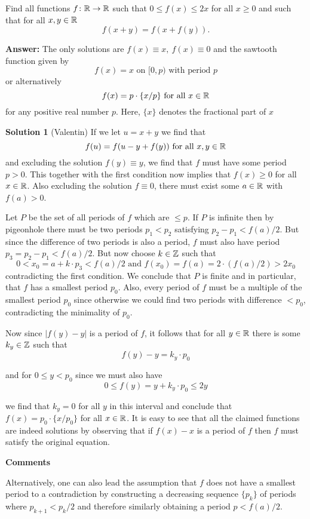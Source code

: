 Find all functions $f\colon \mathbb{R}\to \mathbb{R}$ such that $0\leq f(x)\leq 2x$ for all $x\geq 0$ and such that for all $x,y\in \mathbb{R}$
$$f(x+y)=f(x+f(y)).$$

\textbf{Answer:}
The only solutions are $f(x) \equiv x,\ f(x) \equiv 0$ and the sawtooth function given by
$$f(x) = x \text{ on } [0,p) \text{ with period } p$$
or alternatively
$$f(x) = p\cdot \{x/p\} \text{ for all } x\in\mathbb{R}$$
for any positive real number $p$. Here, $\{x\}$ denotes the fractional part of $x$

\textbf{Solution 1} (Valentin)
If we let $u = x + y$ we find that
$$f(u)=f(u-y+f(y)) \text{ for all } x,y\in\mathbb{R}$$
and excluding the solution $f(y) \equiv y$, we find that $f$ must have some period $p > 0$. This together with the first condition now implies that $f(x)\geq 0$ for all $x\in\mathbb{R}$. Also excluding the solution $f\equiv 0$, there must exist some $a\in\mathbb{R}$ with $f(a) > 0$.

Let $P$ be the set of all periods of $f$ which are $\leq p$. If $P$ is infinite then by pigeonhole there must be two periods $p_1 < p_2$ satisfying $p_2-p_1 < f(a)/2$. But since the difference of two periods is also a period, $f$ must also have period $p_3 = p_2-p_1 < f(a)/2$. But now choose $k\in\mathbb{Z}$ such that
$$0 < x_0 = a+k\cdot p_3 < f(a)/2 \text{ and } f(x_0) = f(a) = 2\cdot(f(a)/2) > 2x_0$$
contradicting the first condition. We conclude that $P$ is finite and in particular, that $f$ has a smallest period $p_0$. Also, every period of $f$ must be a multiple of the smallest period $p_0$ since otherwise we could find two periods with difference $< p_0$, contradicting the minimality of $p_0$.

Now since $|f(y)-y|$ is a period of $f$, it follows that for all $y\in\mathbb{R}$ there is some $k_y\in\mathbb{Z}$ such that
$$f(y)-y = k_y\cdot p_0$$

and for $0\leq y < p_0$ since we must also have
$$0\leq f(y) = y+k_y\cdot p_0 \leq 2y$$

we find that $k_y = 0$ for all $y$ in this interval and conclude that $f(x) = p_0\cdot\{x/p_0\}$ for all $x\in\mathbb{R}$.
It is easy to see that all the claimed functions are indeed solutions by observing that if $f(x)-x$ is a period of $f$ then $f$ must satisfy the original equation.

\textbf{Comments}

Alternatively, one can also lead the assumption that $f$ does not have a smallest period to a contradiction by constructing a decreasing sequence $\{p_k\}$ of periods where $p_{k+1} < p_k/2$ and therefore similarly obtaining a period $p<f(a)/2$.

